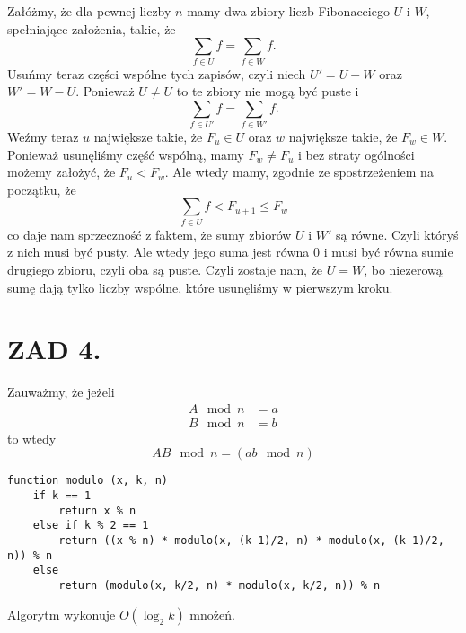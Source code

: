 \documentclass{article}[13pt]
\begin{document}
    Załóżmy, że dla pewnej liczby $n$ mamy dwa zbiory liczb Fibonacciego $U$ i $W$, spełniające założenia, takie, że
    $$\sum\limits_{f\in U}f=\sum\limits_{f\in W}f.$$
    Usuńmy teraz części wspólne tych zapisów, czyli niech $U'=U-W$ oraz $W'=W-U$. Ponieważ $U\neq U$ to te zbiory nie mogą być puste i 
    $$\sum\limits_{f\in U'}f=\sum\limits_{f\in W'}f.$$
    Weźmy teraz $u$ największe takie, że $F_u\in U$ oraz $w$ największe takie, że $F_w\in W$. Ponieważ usunęliśmy część wspólną, mamy $F_w\neq F_u$ i bez straty ogólności możemy założyć, że $F_u<F_w$. Ale wtedy mamy, zgodnie ze spostrzeżeniem na początku, że
    $$\sum\limits_{f\in U}f<F_{u+1}\leq F_w$$
    co daje nam sprzeczność z faktem, że sumy zbiorów $U$ i $W'$ są równe. Czyli któryś z nich musi być pusty. Ale wtedy jego suma jest równa 0 i musi być równa sumie drugiego zbioru, czyli oba są puste. Czyli zostaje nam, że $U=W$, bo niezerową sumę dają tylko liczby wspólne, które usunęliśmy w pierwszym kroku.

    
    \section*{ZAD 4.}

    Zauważmy, że jeżeli
    \begin{align*}
        A\mod n&=a\\
        B\mod n&=b
    \end{align*}
    to wtedy
    $$AB\mod n=(ab\mod n)$$

\begin{lstlisting}[language=juleczka]
function modulo (x, k, n)
    if k == 1
        return x % n
    else if k % 2 == 1
        return ((x % n) * modulo(x, (k-1)/2, n) * modulo(x, (k-1)/2, n)) % n
    else
        return (modulo(x, k/2, n) * modulo(x, k/2, n)) % n
\end{lstlisting}

    Algorytm wykonuje $O(\log_2k)$ mnożeń.
\end{document}
